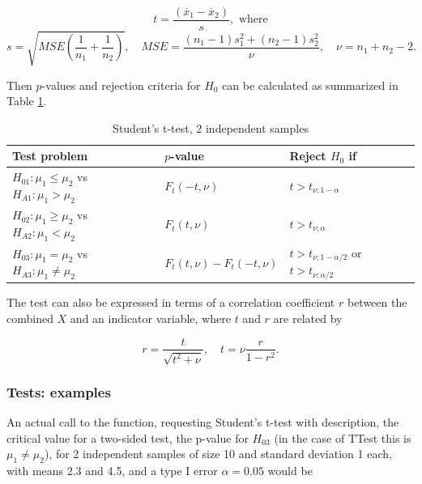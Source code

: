 \begin{equation}
	t= \frac{(\overline{x}_1-\overline{x}_2)}{s}, \text{ where}
\end{equation}
\begin{equation} \label{eq:TTest2i}
	s = \sqrt{\textit{MSE}\left(\frac{1}{n_1}+\frac{1}{n_2}\right)}, \quad \textit{MSE} = \frac{(n_1-1)s_1^2+(n_2-1)s_2^2}{\nu}, \quad \nu=n_1+n_2-2.
\end{equation}

Then $p$-values and rejection criteria for $H_0$ can be calculated as summarized in Table \ref{TableStudentsttest,2i samples}.

\begin{table}[ht]
	\centering
	\begin{tabular}{|l|l|l|}
		\hline
		Test problem & $p$-value & Reject $H_0$ if \\
		\hline
		$H_{01}: \mu_1 \leq \mu_2$ vs $H_{A1}: \mu_1 > \mu_2$ & $F_t\left(-t, \nu\right)$ &$t > t_{\nu;1-\alpha}$ \\
		$H_{02}: \mu_1 \geq \mu_2$ vs $H_{A2}: \mu_1 < \mu_2$ & $F_t\left(t, \nu\right)$  &$t > t_{\nu;\alpha}$ \\
		$H_{03}: \mu_1 = \mu_2$ vs $H_{A3}: \mu_1 \neq \mu_2$ & $F_t\left(t, \nu\right)-F_t\left(-t, \nu\right)$ &$t > t_{\nu;1-\alpha/2}$ or $t > t_{\nu;\alpha/2}$ \\
		\hline
	\end{tabular}
	\caption{Student's t-test, 2 independent samples}
	\label{TableStudentsttest,2i samples}
\end{table}


The test can also be expressed in terms of a correlation coefficient $r$ between the combined $X$ and an indicator variable, where $t$ and $r$ are related by

\begin{equation}
	r=\frac{t}{\sqrt{t^2+\nu}}, \quad t= \nu \frac{r}{1-r^2}.
\end{equation}



\subsubsection{Tests: examples}
An actual call to the function, requesting Student's t-test with description, the critical value for a two-sided test, the p-value for $H_{03}$ (in the case of \textsf{TTest} this is $\mu_1 \neq \mu_2$), for 2 independent samples of size 10 and standard deviation 1 each, with means 2.3 and 4.5, and a type I error $\alpha=0.05$ would be

